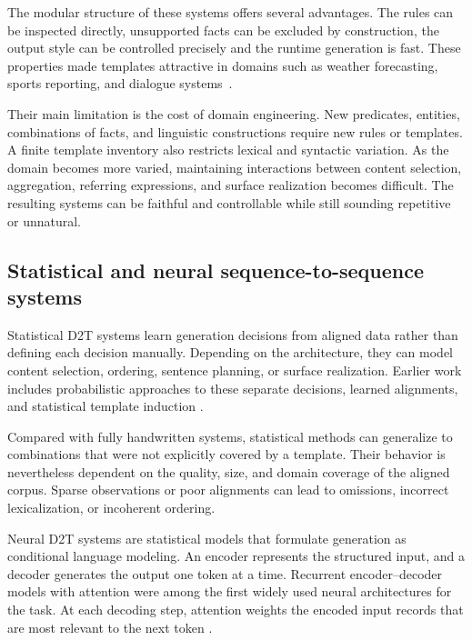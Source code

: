The modular structure of these systems offers several advantages. The rules can
be inspected directly, unsupported facts can be excluded by construction,
the output style can be controlled precisely and the runtime generation is fast.
These properties made
templates attractive in domains such as weather forecasting, sports reporting,
and dialogue systems~\cite{reiter1997building,gatt2018survey}.

Their main limitation is the cost of domain engineering. New predicates,
entities, combinations of facts, and linguistic constructions require new rules
or templates. A finite template inventory also restricts lexical and syntactic
variation. As the domain becomes more varied, maintaining interactions between
content selection, aggregation, referring expressions, and surface realization
becomes difficult. The resulting systems can be faithful and controllable while
still sounding repetitive or unnatural.

\subsection{Statistical and neural sequence-to-sequence systems}

Statistical D2T systems learn generation decisions from aligned data rather
than defining each decision manually. Depending on the architecture, they can
model content selection, ordering, sentence planning, or surface realization.
Earlier work includes probabilistic approaches to these separate decisions,
learned alignments, and statistical template induction
\cite{van-der-lee-etal-2018-automated,gatt2018survey,osuji2024systematic}.

Compared with fully handwritten systems, statistical methods can generalize to
combinations that were not explicitly covered by a template. Their behavior is
nevertheless dependent on the quality, size, and domain coverage of the aligned
corpus. Sparse observations or poor alignments can lead to omissions, incorrect
lexicalization, or incoherent ordering.

Neural D2T systems are statistical models that formulate generation as
conditional language modeling. An encoder represents the structured input, and
a decoder generates the output one token at a time. Recurrent encoder--decoder
models with attention were among the first widely used neural architectures for
the task. At each decoding step, attention weights the encoded input records
that are most relevant to the next token
\cite{gatt2018survey,osuji2024systematic}.

